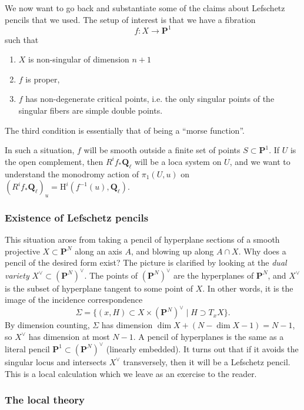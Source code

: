 \documentclass[letterpaper,11pt]{article}
\newcommand{\Q}{\mathbf{Q}}
\newcommand{\PS}{\mathbf{P}}
\newcommand{\mrm}[1]{\mathrm{#1}}
\begin{document}
We now want to go back and substantiate some of the claims about Lefschetz pencils that we used. The setup of interest is that we have a fibration
\[
f \colon X \rightarrow \PS^1
\]
such that 
\begin{enumerate}
\item $X$ is non-singular of dimension $n+1$
\item $f$ is proper, 
\item $f$ has non-degenerate critical points, i.e. the only singular points of the singular fibers are simple double points. 
\end{enumerate}

The third condition is essentially that of being a ``morse function''. 

In such a situation, $f$ will be smooth outside a finite set of points $S \subset \PS^1$. If $U$ is the open complement, then $R^i f_* \Q_{\ell}$ will be a loca system on $U$, and we want to understand the monodromy action of $\pi_1(U,u)$ on $(R^i f_* \Q_{\ell})_u = \mrm{H}^i(f^{-1}(u), \Q_{\ell})$. 

\subsubsection{Existence of Lefschetz pencils}

This situation arose from taking a pencil of hyperplane sections of a smooth projective $X \subset \PS^N$ along an axis $A$, and blowing up along $A \cap X$. Why does a pencil of the desired form exist? The picture is clarified by looking at the \emph{dual variety} $X^{\vee} \subset (\PS^N)^{\vee}$. The points of $ (\PS^N)^{\vee}$ are the hyperplanes of $\PS^N$, and $X^{\vee}$ is the subset of hyperplane tangent to some point of $X$. In other words, it is the image of the incidence correspondence 
\begin{equation}\label{incidence_corres}
\Sigma = \{(x, H) \subset X \times (\PS^N)^{\vee} \mid H \supset T_xX  \}.
\end{equation}
By dimension counting, $\Sigma$ has dimension $\dim X + (N-\dim X-1) = N-1$, so $X^{\vee}$ has dimension at most $N-1$. A pencil of hyperplanes is the same as a literal pencil $\PS^1 \subset (\PS^N)^{\vee}$ (linearly embedded). It turns out that if it avoids the singular locus and intersects $X^{\vee}$ transversely, then it will be a Lefschetz pencil. This is a local calculation which we leave as an exercise to the reader. 
\subsubsection{The local theory}
\end{document}
